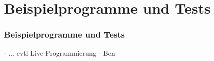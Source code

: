 \section{Beispielprogramme und Tests}

\begin{frame}
\frametitle{Beispielprogramme und Tests}
-  ... evtl Live-Programmierung
    - Ben
\end{frame}